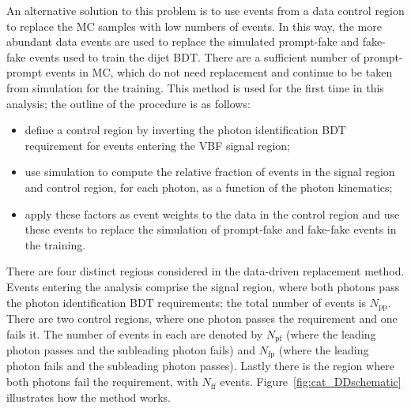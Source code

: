 An alternative solution to this problem is to use events from a data control region 
to replace the MC samples with low numbers of events.
In this way, the more abundant data events are used to replace the simulated prompt-fake and fake-fake 
events used to train the dijet BDT.
There are a sufficient number of prompt-prompt events in MC, 
which do not need replacement and continue to be taken from simulation for the training.
This method is used for the first time in this analysis;
the outline of the procedure is as follows:
\begin{itemize}
\item define a control region by inverting the photon identification BDT requirement 
      for events entering the VBF signal region;
\item use simulation to compute the relative fraction of events in the signal region and control region, 
      for each photon, as a function of the photon kinematics;
\item apply these factors as event weights to the data in the control region 
      and use these events to replace the simulation of prompt-fake and fake-fake events in the training.
\end{itemize}

There are four distinct regions considered in the data-driven replacement method.
Events entering the analysis comprise the signal region, 
where both photons pass the photon identification BDT requirements;
the total number of events is $N_{\textrm{pp}}$.
There are two control regions, where one photon passes the requirement and one fails it.
The number of events in each are denoted by $N_{\textrm{pf}}$ 
(where the leading photon passes and the subleading photon fails) and $N_{\textrm{fp}}$ 
(where the leading photon fails and the subleading photon passes).
Lastly there is the region where both photons fail the requirement, with $N_{\textrm{ff}}$ events.
Figure~\ref{fig:cat_DDschematic} illustrates how the method works.

